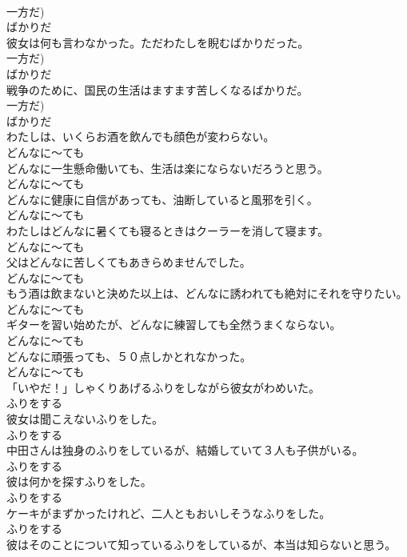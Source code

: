 \documentclass[8pt]{extreport}
\begin{document}
\begin{CJK}{UTF8}{min}
\\	一方だ)	
\\	ばかりだ
\\	彼女は何も言わなかった。ただわたしを睨むばかりだった。	
\\	一方だ)	
\\	ばかりだ
\\	戦争のために、国民の生活はますます苦しくなるばかりだ。	
\\	一方だ)	
\\	ばかりだ
\\	わたしは、いくらお酒を飲んでも顔色が変わらない。	
\\	どんなに～ても
\\	どんなに一生懸命働いても、生活は楽にならないだろうと思う。	
\\	どんなに～ても
\\	どんなに健康に自信があっても、油断していると風邪を引く。	
\\	どんなに～ても
\\	わたしはどんなに暑くても寝るときはクーラーを消して寝ます。	
\\	どんなに～ても
\\	父はどんなに苦しくてもあきらめませんでした。	
\\	どんなに～ても
\\	もう酒は飲まないと決めた以上は、どんなに誘われても絶対にそれを守りたい。	
\\	どんなに～ても
\\	ギターを習い始めたが、どんなに練習しても全然うまくならない。	
\\	どんなに～ても
\\	どんなに頑張っても、５０点しかとれなかった。	
\\	どんなに～ても
\\	「いやだ！」しゃくりあげるふりをしながら彼女がわめいた。	
\\	ふりをする
\\	彼女は聞こえないふりをした。	
\\	ふりをする
\\	中田さんは独身のふりをしているが、結婚していて３人も子供がいる。	
\\	ふりをする
\\	彼は何かを探すふりをした。	
\\	ふりをする
\\	ケーキがまずかったけれど、二人ともおいしそうなふりをした。	
\\	ふりをする
\\	彼はそのことについて知っているふりをしているが、本当は知らないと思う。	

\end{CJK}
\end{document}
